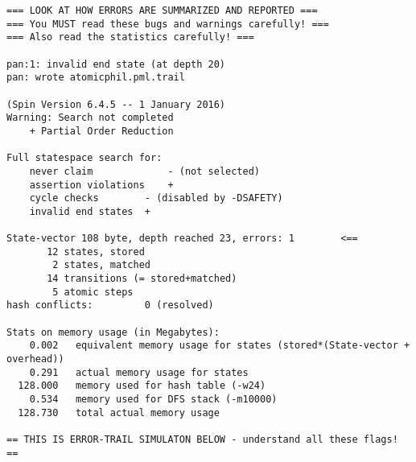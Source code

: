 \documentclass[11pt]{article}
\begin{document}
\begin{scriptsize}
\begin{verbatim}
=== LOOK AT HOW ERRORS ARE SUMMARIZED AND REPORTED ===
=== You MUST read these bugs and warnings carefully! ===
=== Also read the statistics carefully! ===

pan:1: invalid end state (at depth 20)
pan: wrote atomicphil.pml.trail

(Spin Version 6.4.5 -- 1 January 2016)
Warning: Search not completed
	+ Partial Order Reduction

Full statespace search for:
	never claim         	- (not selected)         
	assertion violations	+                        
	cycle checks       	- (disabled by -DSAFETY) 
	invalid end states	+                        
 
State-vector 108 byte, depth reached 23, errors: 1        <==
       12 states, stored
        2 states, matched
       14 transitions (= stored+matched)
        5 atomic steps
hash conflicts:         0 (resolved)

Stats on memory usage (in Megabytes):
    0.002	equivalent memory usage for states (stored*(State-vector + overhead))
    0.291	actual memory usage for states
  128.000	memory used for hash table (-w24)
    0.534	memory used for DFS stack (-m10000)
  128.730	total actual memory usage

== THIS IS ERROR-TRAIL SIMULATON BELOW - understand all these flags! ==


\end{verbatim}
\end{scriptsize}
\end{document}
